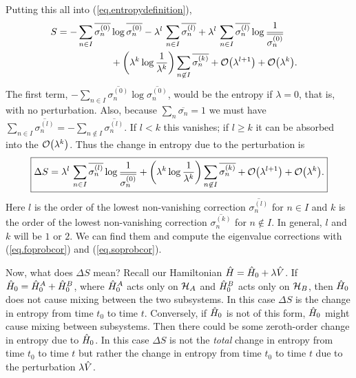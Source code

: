 Putting this all into (\ref{eq.entropydefinition}),
\begin{align*}
\hspace{-1em} S = -\sum_{n \in I} \overline{\sigma_n^{(0)}} &\log \overline{\sigma_n^{(0)}} - \lambda^l\, \sum_{n \in I}\overline{\sigma_n^{(l)}}+\lambda^l\, \sum_{n \in I}\overline{\sigma_n^{(l)}}\log\frac{1}{\overline{\sigma_n^{(0)}}} \\&+\left(\lambda^{k}\log\frac{1}{\lambda^k}\right)\sum_{n\not\in I} \overline{\sigma_n^{(k)}} + \mathcal{O}{\left(\lambda^{l+1}\right)} + \mathcal{O}{\left(\lambda^{k}\right)}.
\end{align*}
The first term, \(- \sum_{n \in I} \overline{\sigma_n^{(0)}} \log \overline{\sigma_n^{(0)}}\), would be the entropy if \(\lambda=0\), that is, with no perturbation. Also, because \(\sum_n\overline{\sigma_n} = 1\) we must have \(\sum_{n\in I}\overline{\sigma_n^{(l)}} = -\sum_{n\not\in I} \overline{\sigma_n^{(l)}}\). If \(l < k\) this vanishes; if \(l \geq k\) it can be absorbed into the \(\mathcal{O}{\left(\lambda^k\right)}\). Thus the change in entropy due to the perturbation is
\begin{equation}\label{eq.deltaS.noassumptions}
\boxed{\Delta S = \lambda^l\, \sum_{n \in I}\overline{\sigma_n^{(l)}}\log\frac{1}{\overline{\sigma_n^{(0)}}} +\left(\lambda^{k}\log\frac{1}{\lambda^k}\right)\sum_{n\not\in I} \overline{\sigma_n^{(k)}} + \mathcal{O}{\left(\lambda^{l+1}\right)} + \mathcal{O}{\left(\lambda^{k}\right)}.}
\end{equation}
Here \(l\) is the order of the lowest non-vanishing correction \(\overline{\sigma_n^{(l)}}\) for \(n \in I\) and \(k\) is the order of the lowest non-vanishing correction \(\overline{\sigma_n^{(k)}}\) for \(n \not\in I\). In general, \(l\) and \(k\) will be \(1\) or \(2\). We can find them and compute the eigenvalue corrections with (\ref{eq.foprobcor}) and (\ref{eq.soprobcor}).

Now, what does \(\Delta S\) mean? Recall our Hamiltonian \(\hat{H} = \hat{H}_0 + \lambda \hat{V}\).
If \(\hat{H}_0 = \hat{H}_0^A + \hat{H}_0^B\), where \(\hat{H}_0^A\) acts only on \(\mathcal{H}_A\) and \(\hat{H}_0^B\) acts only on \(\mathcal{H}_B\), then \(\hat{H}_0\) does not cause mixing between the two subsystems. In this case \(\Delta S\) is the change in entropy from time \(t_0\) to time \(t\).
Conversely, if \(\hat{H}_0\) is not of this form, \(\hat{H}_0\) might cause mixing between subsystems. Then there could be some zeroth-order change in entropy due to \(\hat{H}_0\). In this case \(\Delta S\) is not the \emph{total} change in entropy from time \(t_0\) to time \(t\) but rather the change in entropy from time \(t_0\) to time \(t\) due to the perturbation \(\lambda \hat{V}\).

